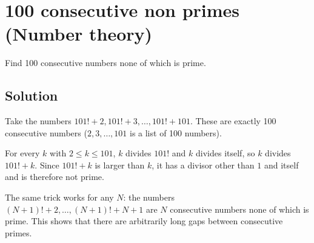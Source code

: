 \section {100 consecutive non primes (Number theory)}

Find 100 consecutive numbers none of which is prime.

\subsection{Solution}

Take the numbers $101!+2, 101!+3, \ldots, 101!+101$.
These are exactly 100 consecutive numbers ($2, 3, \ldots, 101$ is a list of 100 numbers).

For every $k$ with $2 \le k \le 101$, $k$ divides $101!$ and $k$ divides itself, so $k$ divides $101!+k$.
Since $101!+k$ is larger than $k$, it has a divisor other than $1$ and itself and is therefore not prime.

The same trick works for any $N$: the numbers $(N+1)!+2, \ldots, (N+1)!+N+1$ are $N$ consecutive numbers none of which is prime.
This shows that there are arbitrarily long gaps between consecutive primes.
